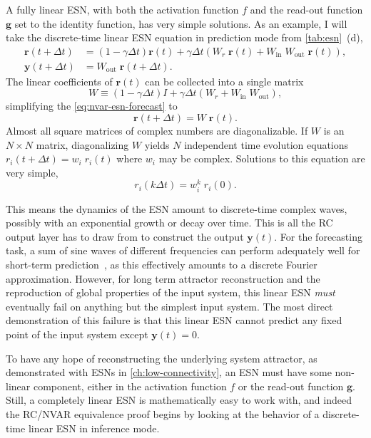 A fully linear ESN, with both the activation function $f$ and the
read-out function $\bm{g}$ set to the identity function, has very
simple solutions. 
As an example, I will take the discrete-time linear
ESN equation in prediction mode from \cref{tab:esn}~(d),
\begin{align}
  \bm{r}(t + \Delta t) &= (1 - \gamma \Delta t) \bm{r}(t) + \gamma \Delta t \left( W_r\;\bm{r}(t) + W_\text{in}\;W_\text{out}\;\bm{r}(t)\right), \label{eq:nvar-esn-forecast} \\
  \bm{y}(t+\Delta t) &= W_\text{out}\;\bm{r}(t+\Delta t).
\end{align}
The linear coefficients of $\bm{r}(t)$ can be collected into a single matrix
\begin{equation}
  W \equiv (1 - \gamma \Delta t) I + \gamma \Delta t \left( W_r + W_\text{in}\;W_\text{out}\right),
\end{equation}
simplifying the \cref{eq:nvar-esn-forecast} to
\begin{equation}
  \bm{r}(t + \Delta t) = W\;\bm{r}(t).
\end{equation}
Almost all square matrices of complex numbers are diagonalizable. If
$W$ is an $N \times N$ matrix, diagonalizing $W$ yields $N$
independent time evolution equations $r_i(t + \Delta t) = w_i\;
r_i(t)$ where $w_i$ may be complex. Solutions to this equation are very simple,
\begin{equation}
  r_i(k \Delta t) = w_i^k\; r_i(0).
\end{equation}

This means the dynamics of the ESN amount to discrete-time complex
waves, possibly with an exponential growth or decay over time. This is
all the RC output layer has to draw from to construct the output
$\bm{y}(t)$. For the forecasting task, a sum of sine waves of
different frequencies can perform adequately well for short-term
prediction~\cite{bollt2021}, as this effectively amounts to a discrete Fourier
approximation. However, for long term attractor reconstruction and the
reproduction of global properties of the input system, this linear ESN
\emph{must} eventually fail on anything but the simplest input
system. The most direct demonstration of this failure is that this
linear ESN cannot predict any fixed point of the input system except
$\bm{y}(t) = 0$.

To have any hope of reconstructing the underlying system attractor, as
demonstrated with ESNs in \cref{ch:low-connectivity}, an ESN must have some non-linear component, either in the
activation function $f$ or the read-out function
$\bm{g}$. Still, a completely linear ESN is mathematically easy to
work with, and indeed the RC/NVAR equivalence proof begins by looking
at the behavior of a discrete-time linear ESN in inference mode.

